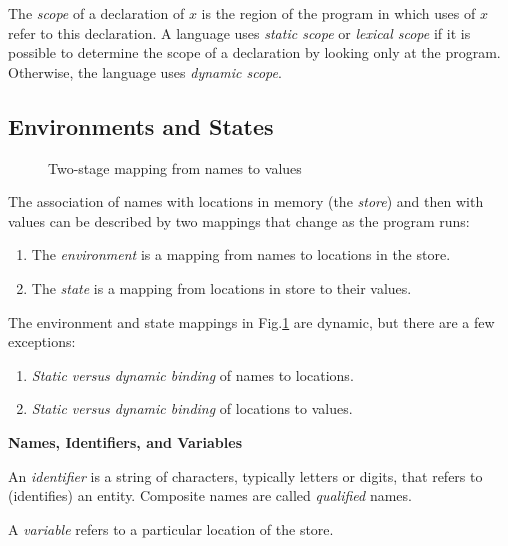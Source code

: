 \documentclass[a4paper,twoside]{book}
\begin{document}
The \textit{scope} of a declaration of $x$ is the region of the program in which uses of $x$ refer to this declaration. A language uses \textit{static scope} or \textit{lexical scope} if it is possible to determine the scope of a declaration by looking only at the program. Otherwise, the language uses \textit{dynamic scope}.

\subsection{Environments and States}

\begin{figure}[htbp]
    \centering
    \caption{Two-stage mapping from names to values}
    \label{figure:1.8}
\end{figure}

The association of names with locations in memory (the \textit{store}) and then with values can be described by two mappings that change as the program runs:
\begin{enumerate}
    \item The \textit{environment} is a mapping from names to locations in the store.
    \item The \textit{state} is a mapping from locations in store to their values.
\end{enumerate}

The environment and state mappings in Fig.\;\ref{figure:1.8} are dynamic, but there are a few exceptions:
\begin{enumerate}
    \item \textit{Static versus dynamic binding} of names to locations.
    \item \textit{Static versus dynamic binding} of locations to values.
\end{enumerate}

\begin{framed}
\begin{center}
    \textbf{{\large Names, Identifiers, and Variables}}
\end{center}

An \textit{identifier} is a string of characters, typically letters or digits, that refers to (identifies) an entity. Composite names are called \textit{qualified} names.

A \textit{variable} refers to a particular location of the store.
\end{framed}
\end{document}
